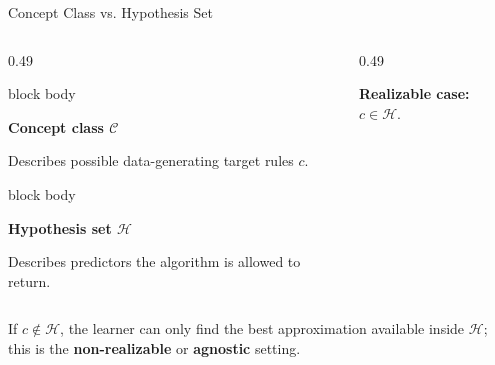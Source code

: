 \documentclass[aspectratio=169,10pt]{beamer}
\newcommand{\C}{\mathcal{C}}
\newcommand{\Hc}{\mathcal{H}}
\begin{document}
\begin{frame}[t]{Concept Class vs. Hypothesis Set}
  \vspace{0.18cm}
  \begin{columns}[T,totalwidth=\textwidth]
    \begin{column}{0.49\textwidth}
      \begin{beamercolorbox}[rounded=true,sep=0.25cm,wd=\linewidth]{block body}
        {\normalsize
        \textbf{Concept class $\C$}\par
        \vspace{0.10cm}
        Describes possible data-generating target rules $c$.
        }
      \end{beamercolorbox}
      \vspace{0.25cm}
      \begin{beamercolorbox}[rounded=true,sep=0.25cm,wd=\linewidth]{block body}
        {\normalsize
        \textbf{Hypothesis set $\Hc$}\par
        \vspace{0.10cm}
        Describes predictors the algorithm is allowed to return.
        }
      \end{beamercolorbox}
    \end{column}
    \begin{column}{0.49\textwidth}
      \centering
      \vspace{0.10cm}
      {\normalsize \textbf{Realizable case:} $c\in\Hc$.}
    \end{column}
  \end{columns}
  \vspace{0.34cm}
  {\normalsize
  If $c\notin\Hc$, the learner can only find the best approximation available inside $\Hc$; this is the \textbf{non-realizable} or \textbf{agnostic} setting.}
\end{frame}
\end{document}
